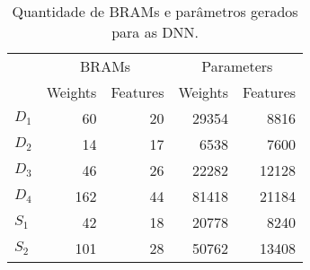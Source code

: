 \begin{table}[ht!]
\centering
\caption{Quantidade de BRAMs e parâmetros gerados para as DNN.}
\label{tab:5-dnn-report}
\begin{tabular}{lrrrr}
\toprule
 & \multicolumn{2}{c}{BRAMs} & \multicolumn{2}{c}{Parameters} \\
\cmidrule(r){2-3} \cmidrule(l){4-5}
 & Weights & Features & Weights & Features \\
\midrule
$D_1$ & 60 & 20 & 29354 & 8816 \\
$D_2$ & 14 & 17 & 6538 & 7600 \\
$D_3$ & 46 & 26 & 22282 & 12128 \\
$D_4$ & 162 & 44 & 81418 & 21184 \\
$S_1$ & 42 & 18 & 20778 & 8240 \\
$S_2$ & 101 & 28 & 50762 & 13408 \\
\bottomrule
\end{tabular}
\end{table}